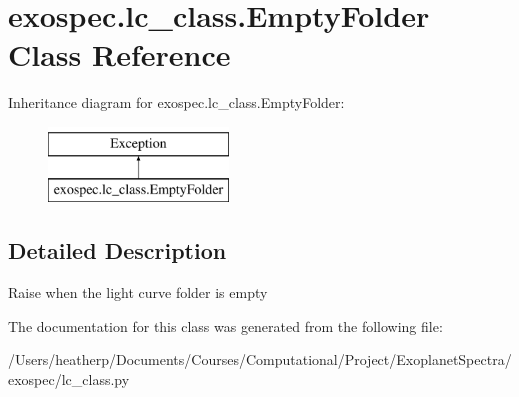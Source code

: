 \hypertarget{classexospec_1_1lc__class_1_1_empty_folder}{}\section{exospec.\+lc\+\_\+class.\+Empty\+Folder Class Reference}
\label{classexospec_1_1lc__class_1_1_empty_folder}
Inheritance diagram for exospec.\+lc\+\_\+class.\+Empty\+Folder\+:\begin{figure}[H]
\begin{center}
\leavevmode
\includegraphics[height=2.000000cm]{classexospec_1_1lc__class_1_1_empty_folder}
\end{center}
\end{figure}


\subsection{Detailed Description}
\begin{DoxyVerb}Raise when the light curve folder is empty\end{DoxyVerb}
 

The documentation for this class was generated from the following file\+:\begin{DoxyCompactItemize}
\item 
/\+Users/heatherp/\+Documents/\+Courses/\+Computational/\+Project/\+Exoplanet\+Spectra/exospec/lc\+\_\+class.\+py\end{DoxyCompactItemize}
